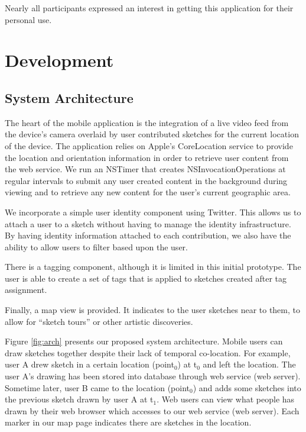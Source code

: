 \documentclass{chi2009}
\begin{document}
Nearly all participants expressed an interest in getting this application for
their personal use.

\section{Development}

\subsection{System Architecture}

The heart of the mobile application is the integration of a live video
feed from the device's camera overlaid by user contributed sketches for the
current location of the device.  The application relies on Apple's
CoreLocation service to provide the location and orientation information in
order to retrieve user content from the web service.  We run an NSTimer
that creates NSInvocationOperations at regular intervals to submit any user
created content in the background during viewing and to retrieve any new
content for the user's current geographic area.

We incorporate a simple user identity component using Twitter. This allows us to attach a user to a sketch without having to manage the identity infrastructure.  By having identity information attached to each
contribution, we also have the ability to allow users to filter based upon
the user.

There is a tagging component, although it is limited in this initial
prototype.  The user is able to create a set of tags that is applied
to sketches created after tag assignment.

Finally, a map view is provided. It indicates to the user sketches
near to them, to allow for ``sketch tours'' or other artistic discoveries.

Figure \ref{fig:arch} presents our proposed system architecture. Mobile users
can draw sketches together despite their lack of temporal co-location. For
example, user A drew sketch in a certain location (point$_{0}$) at t$_{0}$ and
left the location. The user A's drawing has been stored into database through
web service (web server). Sometime later, user B came to the location
(point$_{0}$) and adds some sketches into the previous sketch drawn by user A
at t$_{1}$. Web users can view what people has drawn by their web browser which
accesses to our web service (web server). Each marker in our map page indicates
there are sketches in the location.
\end{document}
